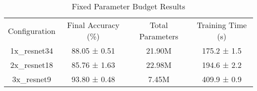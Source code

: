 \begin{table}
    \centering
    \begin{tabular}{cccc}
        Configuration & Final Accuracy (\%) & Total Parameters & Training Time (s) \\
        1x_resnet34 & 88.05 ± 0.51 & 21.90M & 175.2 ± 1.5 \\
        2x_resnet18 & 85.76 ± 1.63 & 22.98M & 194.6 ± 2.2 \\
        3x_resnet9 & 93.80 ± 0.48 & 7.45M & 409.9 ± 0.9 \\
    \end{tabular}
    \caption{Fixed Parameter Budget Results}
    \label{tab:fixed_param_scale}
\end{table}